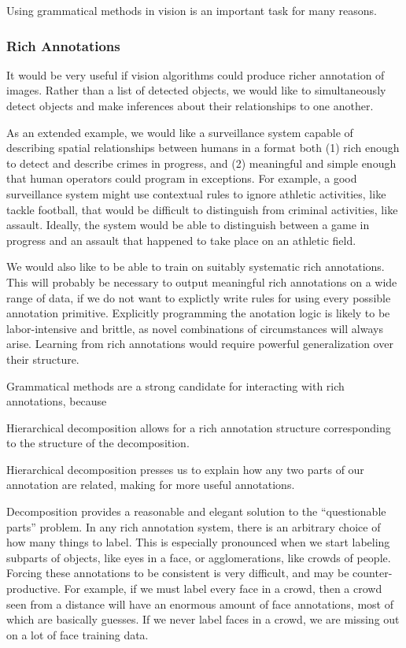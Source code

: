 \documentclass{article}
\begin{document}
Using grammatical methods in vision is an important task for many reasons.

\subsubsection{Rich Annotations}

It would be very useful if vision algorithms could produce richer
annotation of images. Rather than a list of detected objects, we would
like to simultaneously detect objects and make inferences about their
relationships to one another. 

As an extended example, we would like a surveillance system capable of
describing spatial relationships between humans in a format both (1)
rich enough to detect and describe crimes in progress, and (2)
meaningful and simple enough that human operators could program in
exceptions. For example, a good surveillance system might use
contextual rules to ignore athletic activities, like tackle football,
that would be difficult to distinguish from criminal activities, like
assault. Ideally, the system would be able to distinguish between a
game in progress and an assault that happened to take place on an
athletic field.

We would also like to be able to train on suitably systematic rich
annotations. This will probably be necessary to output meaningful rich
annotations on a wide range of data, if we do not want to explictly
write rules for using every possible annotation primitive. Explicitly
programming the anotation logic is likely to be labor-intensive and
brittle, as novel combinations of circumstances will always arise.
Learning from rich annotations would require powerful generalization
over their structure.

Grammatical methods are a strong candidate for interacting with rich
annotations, because 

\bitem
\item Hierarchical decomposition allows for a rich annotation
  structure corresponding to the structure of the decomposition.

\item Hierarchical decomposition presses us to explain how any two
  parts of our annotation are related, making for more useful
  annotations.

\item Decomposition provides a reasonable and elegant solution to the
  ``questionable parts'' problem. In any rich annotation system, there
  is an arbitrary choice of how many things to label. This is
  especially pronounced when we start labeling subparts of objects,
  like eyes in a face, or agglomerations, like crowds of
  people. Forcing these annotations to be consistent is very
  difficult, and may be counter-productive. For example, if we must
  label every face in a crowd, then a crowd seen from a distance will
  have an enormous amount of face annotations, most of which are
  basically guesses. If we never label faces in a crowd, we are
  missing out on a lot of face training data.
  
\end{document}
